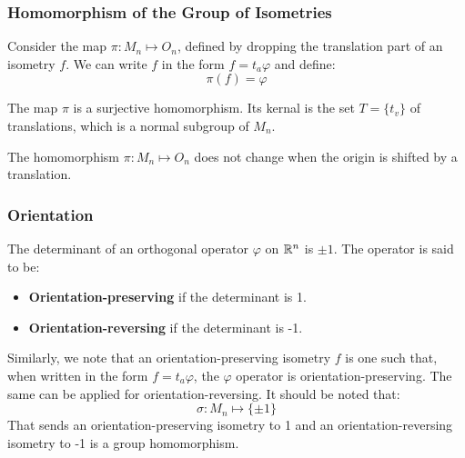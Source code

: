 \documentclass[letterpaper]{article}
\begin{document}
\subsubsection{Homomorphism of the Group of Isometries}
Consider the map $\pi: M_n \mapsto O_n$, defined by dropping the translation part of an isometry $f$. We can write $f$ in the form $f = t_a \varphi$ and define: 
\[\pi(f) = \varphi\]

\begin{mdframed}
    \begin{proposition}
        The map $\pi$ is a surjective homomorphism. Its kernal is the set $T = \{t_v\}$ of translations, which is a normal subgroup of $M_n$.
    \end{proposition}    
\end{mdframed}

\begin{corollary}{}{}
    The homomorphism $\pi: M_n \mapsto O_n$ does not change when the origin is shifted by a translation. 
\end{corollary}

\subsubsection{Orientation}
The determinant of an orthogonal operator $\varphi$ on $\mathbb{R}^n$ is $\pm 1$. The operator is said to be:
\begin{itemize}
    \item \textbf{Orientation-preserving} if the determinant is 1. 
    \item \textbf{Orientation-reversing} if the determinant is -1. 
\end{itemize}
Similarly, we note that an orientation-preserving isometry $f$ is one such that, when written in the form $f = t_a \varphi$, the $\varphi$ operator is orientation-preserving. The same can be applied for orientation-reversing. It should be noted that: 
\[\sigma: M_n \mapsto \{\pm 1\}\]
That sends an orientation-preserving isometry to 1 and an orientation-reversing isometry to -1 is a group homomorphism. 
\end{document}
